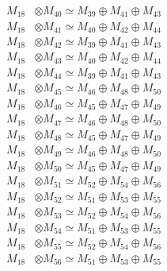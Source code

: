 \begin{align*}
M_{18} &\otimes M_{40} \simeq M_{39} \oplus M_{41} \oplus M_{43} \\
M_{18} &\otimes M_{41} \simeq M_{40} \oplus M_{42} \oplus M_{44} \\
M_{18} &\otimes M_{42} \simeq M_{39} \oplus M_{41} \oplus M_{43} \\
M_{18} &\otimes M_{43} \simeq M_{40} \oplus M_{42} \oplus M_{44} \\
M_{18} &\otimes M_{44} \simeq M_{39} \oplus M_{41} \oplus M_{43} \\
M_{18} &\otimes M_{45} \simeq M_{46} \oplus M_{48} \oplus M_{50} \\
M_{18} &\otimes M_{46} \simeq M_{45} \oplus M_{47} \oplus M_{49} \\
M_{18} &\otimes M_{47} \simeq M_{46} \oplus M_{48} \oplus M_{50} \\
M_{18} &\otimes M_{48} \simeq M_{45} \oplus M_{47} \oplus M_{49} \\
M_{18} &\otimes M_{49} \simeq M_{46} \oplus M_{48} \oplus M_{50} \\
M_{18} &\otimes M_{50} \simeq M_{45} \oplus M_{47} \oplus M_{49} \\
M_{18} &\otimes M_{51} \simeq M_{52} \oplus M_{54} \oplus M_{56} \\
M_{18} &\otimes M_{52} \simeq M_{51} \oplus M_{53} \oplus M_{55} \\
M_{18} &\otimes M_{53} \simeq M_{52} \oplus M_{54} \oplus M_{56} \\
M_{18} &\otimes M_{54} \simeq M_{51} \oplus M_{53} \oplus M_{55} \\
M_{18} &\otimes M_{55} \simeq M_{52} \oplus M_{54} \oplus M_{56} \\
M_{18} &\otimes M_{56} \simeq M_{51} \oplus M_{53} \oplus M_{55} \\
\end{align*}

